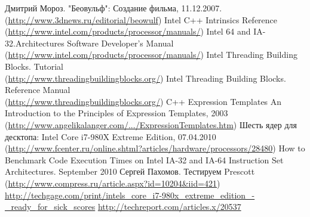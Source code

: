 \documentclass[12pt, a4paper, utf8]{article}
\begin{document}
\begin{thebibliography}{99}
	 Дмитрий Мороз. "Беовульф": Создание фильма, 11.12.2007.\\ (\href{http://www.3dnews.ru/editorial/beowulf}{http://www.3dnews.ru/editorial/beowulf})
	 Intel C++ Intrinsics Reference \\ (\href{http://www.intel.com/products/processor/manuals/}{http://www.intel.com/products/processor/manuals/})
	 Intel 64 and IA-32.Architectures Software Developer's Manual \\ (\href{http://www.intel.com/products/processor/manuals/}{http://www.intel.com/products/processor/manuals/})
	 Intel Threading Building Blocks. Tutorial \\ (\href{http://www.threadingbuildingblocks.org/}{http://www.threadingbuildingblocks.org/})
	 Intel Threading Building Blocks. Reference Manual \\ (\href{http://www.threadingbuildingblocks.org/}{http://www.threadingbuildingblocks.org/})
	 C++ Expression Templates An Introduction to the Principles of Expression Templates, 2003 \\ (\href{http://www.angelikalanger.com/Articles/Cuj/ExpressionTemplates/ExpressionTemplates.htm}{http://www.angelikalanger.com/.../ExpressionTemplates.htm})
	 Шесть ядер для десктопа: Intel Core i7-980X Extreme Edition, 07.04.2010 \\ (\href{http://www.fcenter.ru/online.shtml?articles/hardware/processors/28480}{\small http://www.fcenter.ru/online.shtml?articles/hardware/processors/28480})
	 How to Benchmark Code Execution Times on Intel IA-32 and IA-64 Instruction Set Architectures. September 2010
	 Сергей Пахомов. Тестируем Prescott \\ (\href{http://www.compress.ru/article.aspx?id=10204&iid=421}{\small http://www.compress.ru/article.aspx?id=10204\&iid=421})
	\href{http://techgage.com/print/intels_core_i7-980x_extreme_edition_-_ready_for_sick_scores}{\small http://techgage.com/print/intels\_core\_i7-980x\_extreme\_edition\_-\_ready\_for\_sick\_scores}
	\href{http://techreport.com/articles.x/20537}{\small http://techreport.com/articles.x/20537}
\end{thebibliography}

\newpage
\listoffigures

\newpage
\listoftables

\newpage

\end{document}
